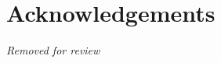 \documentclass[11pt]{article}
\begin{document}
\section*{Acknowledgements}

\emph{Removed for review}

%


\end{document}
